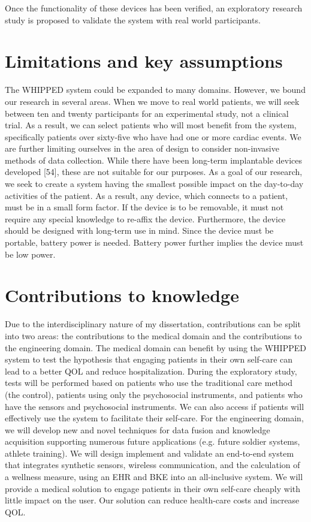 Once the functionality of these devices has been verified, an exploratory research study is proposed to validate the system with real world participants.

\section{Limitations and key assumptions}
\label{sec:LimitationsAndKeyAssumptions}
The WHIPPED system could be expanded to many domains. However, we bound our research in several areas. When we move to real world patients, we will seek between ten and twenty participants for an experimental study, not a clinical trial. As a result, we can select patients who will most benefit from the system, specifically patients over sixty-five who have had one or more cardiac events. We are further limiting ourselves in the area of design to consider non-invasive methods of data collection. While there have been long-term implantable devices developed [54], these are not suitable for our purposes. As a goal of our research, we seek to create a system having the smallest possible impact on the day-to-day activities of the patient. As a result, any device, which connects to a patient, must be in a small form factor. If the device is to be removable, it must not require any special knowledge to re-affix the device.  Furthermore, the device should be designed with long-term use in mind. Since the device must be portable, battery power is needed. Battery power further implies the device must be low power.

\section{Contributions to knowledge}
\label{sec:ContributionsToKnowledge}
Due to the interdisciplinary nature of my dissertation, contributions can be split into two areas: the contributions to the medical domain and the contributions to the engineering domain. The medical domain can benefit by using the WHIPPED system to test the hypothesis that engaging patients in their own self-care can lead to a better QOL and reduce hospitalization. During the exploratory study, tests will be performed based on patients who use the traditional care method (the control), patients using only the psychosocial instruments, and patients who have the sensors and psychosocial instruments. We can also access if patients will effectively use the system to facilitate their self-care.
For the engineering domain, we will develop new and novel techniques for data fusion and knowledge acquisition supporting numerous future applications (e.g. future soldier systems, athlete training). We will design implement and validate an end-to-end system that integrates synthetic sensors, wireless communication, and the calculation of a wellness measure, using an EHR and BKE into an all-inclusive system. We will provide a medical solution to engage patients in their own self-care cheaply with little impact on the user. Our solution can reduce health-care costs and increase QOL. 

